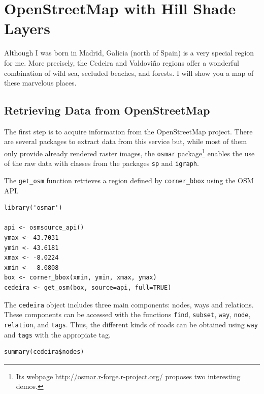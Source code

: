 
\section{\floweroneleft OpenStreetMap with Hill Shade Layers}
\label{sec-1}

Although I was born in Madrid, Galicia (north of Spain) is a very
special region for me. More precisely, the Cedeira and Valdoviño
regions offer a wonderful combination of wild sea, secluded beaches,
and forests. I will show you a map of these marvelous places.

\subsection{Retrieving Data from OpenStreetMap}
\label{sec-1-1}
The first step is to acquire information from the OpenStreetMap
project. There are several packages to extract data from this service
but, while most of them only provide already rendered raster images,
the \texttt{osmar} package\footnote{Its webpage \url{http://osmar.r-forge.r-project.org/} proposes
two interesting demos.} \cite{Eugster.Schlesinger2010} enables the
use of the raw data with classes from the packages \texttt{sp} and \texttt{igraph}.

The \texttt{get\_osm} function retrieves a region defined by \texttt{corner\_bbox}
using the OSM API.


\lstset{language=R,numbers=none}
\begin{lstlisting}
library('osmar')

api <- osmsource_api()
ymax <- 43.7031
ymin <- 43.6181
xmax <- -8.0224
xmin <- -8.0808
box <- corner_bbox(xmin, ymin, xmax, ymax)
cedeira <- get_osm(box, source=api, full=TRUE)
\end{lstlisting}

The \texttt{cedeira} object includes three main components: nodes, ways and
relations. These components can be accessed with the functions \texttt{find},
\texttt{subset}, \texttt{way}, \texttt{node}, \texttt{relation}, and \texttt{tags}. Thus, the different
kinds of roads can be obtained using \texttt{way} and \texttt{tags} with the
appropiate tag.

\lstset{language=R,numbers=none}
\begin{lstlisting}
summary(cedeira$nodes)
\end{lstlisting}

